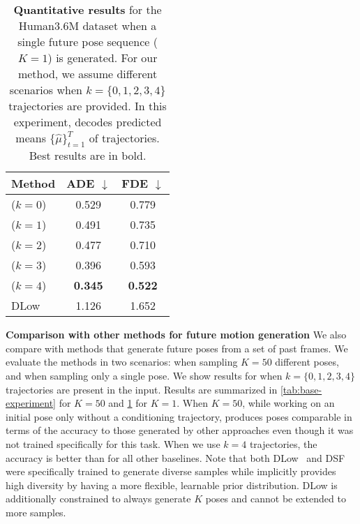 \documentclass[10pt,twocolumn,letterpaper]{article}
\renewcommand{\hat}[1]{\widehat{#1}}
\renewcommand{\paragraph}[1]{\noindent\textbf{#1}\enskip}
\begin{document}
\begin{table}[t!]
\centering
\scriptsize
\begin{tabular}{lcc}
    \toprule
         Method  &  ADE $\downarrow$ & FDE  $\downarrow$ \\
    \midrule             
        \textbf{\trajevae{}} ($ k = 0$) &  0.529 &  0.779 \\
        \textbf{\trajevae{}} ($k = 1$) & 0.491 & 0.735 \\
        \textbf{\trajevae{}} ($ k = 2$) &  0.477 &  0.710 \\
        \textbf{\trajevae{}} ($k = 3$) & 0.396 & 0.593\\
        \textbf{\trajevae{}} ($k = 4$) & \textbf{0.345} & \textbf{0.522} \\
    \midrule
        DLow \cite{yuan2020dlow} & 1.126 & 1.652 \\
    \bottomrule
\end{tabular}
\caption{\textbf{Quantitative results} for the Human3.6M dataset when a single future pose sequence ($K=1$) is generated. For our method, we assume different scenarios when \mbox{$k=\{0, 1, 2, 3, 4\}$} trajectories are provided. In this experiment, \trajevae{} decodes predicted means $\{\hat{\mu}\}^T_{t=1}$ of trajectories. Best results are in bold.}
\label{tab:single-sample-experiment}                                
\vspace{-0.75em}
\end{table}               

\paragraph{Comparison with other methods for future motion generation} We also compare \trajevae{} with methods that generate future poses from a set of past frames. 
We evaluate the methods in two scenarios: when sampling $K=50$ different poses, and when sampling only a single pose. We show results for \trajevae{} when $k=\{0, 1,2, 3, 4\}$ trajectories are present in the input. Results are summarized in \cref{tab:base-experiment} for $K=50$ and \cref{tab:single-sample-experiment} for $K=1$. When $K=50$, while working on an initial pose only without a conditioning trajectory, \trajevae{} produces poses comparable in terms of the accuracy to those generated by other approaches even though it was not trained specifically for this task. When we use $k = 4$ trajectories, the accuracy is better than for all other baselines. Note that both DLow~\cite{yuan2020dlow} and DSF~\cite{yuan2019diverse} were specifically trained to generate diverse samples while \trajevae{} implicitly provides high diversity by having a more flexible, learnable prior distribution. DLow is additionally constrained to always generate $K$ poses and cannot be extended to more samples.
\end{document}
